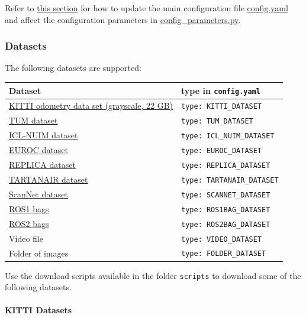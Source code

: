 \documentclass{article}
\let\oldparagraph\paragraph
\renewcommand{\paragraph}[1]{\oldparagraph{#1}\mbox{}}
\begin{document}
Refer to
\protect\hyperlink{selecting-a-dataset-and-different-configuration-parameters}{this
section} for how to update the main configuration file
\href{./config.yaml}{config.yaml} and affect the configuration
parameters in \href{./config_parameters.py}{config\_parameters.py}.

\hypertarget{datasets}{%
\subsubsection{Datasets}\label{datasets}}

The following datasets are supported:

\begin{longtable}[]{@{}ll@{}}
\toprule
Dataset & type in \texttt{config.yaml}\tabularnewline
\midrule
\endhead
\href{http://www.cvlibs.net/datasets/kitti/eval_odometry.php}{KITTI
odometry data set (grayscale, 22 GB)} &
\texttt{type:\ KITTI\_DATASET}\tabularnewline
\href{https://vision.in.tum.de/data/datasets/rgbd-dataset/download}{TUM
dataset} & \texttt{type:\ TUM\_DATASET}\tabularnewline
\href{https://www.doc.ic.ac.uk/~ahanda/VaFRIC/iclnuim.html}{ICL-NUIM
dataset} & \texttt{type:\ ICL\_NUIM\_DATASET}\tabularnewline
\href{http://projects.asl.ethz.ch/datasets/doku.php?id=kmavvisualinertialdatasets}{EUROC
dataset} & \texttt{type:\ EUROC\_DATASET}\tabularnewline
\href{https://github.com/facebookresearch/Replica-Dataset}{REPLICA
dataset} & \texttt{type:\ REPLICA\_DATASET}\tabularnewline
\href{https://theairlab.org/tartanair-dataset/}{TARTANAIR dataset} &
\texttt{type:\ TARTANAIR\_DATASET}\tabularnewline
\href{http://www.scan-net.org/}{ScanNet dataset} &
\texttt{type:\ SCANNET\_DATASET}\tabularnewline
\href{https://wiki.ros.org/Bags}{ROS1 bags} &
\texttt{type:\ ROS1BAG\_DATASET}\tabularnewline
\href{https://docs.ros.org/en/foxy/Tutorials/Beginner-CLI-Tools/Recording-And-Playing-Back-Data/Recording-And-Playing-Back-Data.html}{ROS2
bags} & \texttt{type:\ ROS2BAG\_DATASET}\tabularnewline
Video file & \texttt{type:\ VIDEO\_DATASET}\tabularnewline
Folder of images & \texttt{type:\ FOLDER\_DATASET}\tabularnewline
\bottomrule
\end{longtable}

Use the download scripts available in the folder \texttt{scripts} to
download some of the following datasets.

\hypertarget{kitti-datasets}{%
\paragraph{KITTI Datasets}\label{kitti-datasets}}
\end{document}
